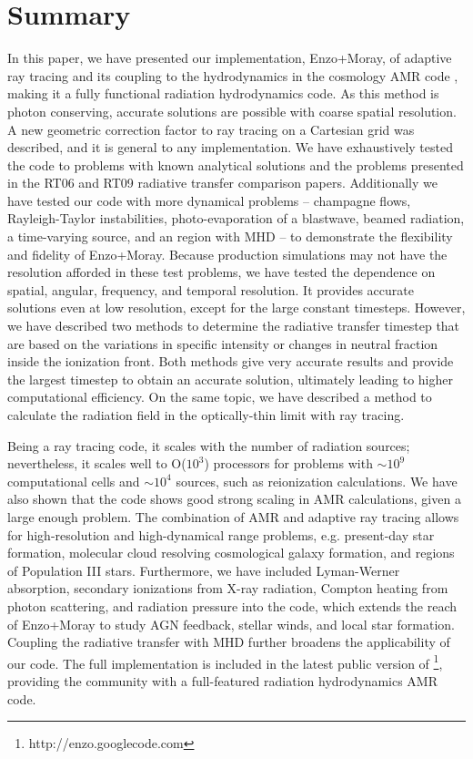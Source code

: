 \documentclass[useAMS,usenatbib,a4paper]{mn2e}
\begin{document}
\section{Summary}

In this paper, we have presented our implementation, Enzo+Moray, of
adaptive ray tracing \citep{Abel02_RT} and its coupling to the
hydrodynamics in the cosmology AMR code \enzo, making it a fully
functional radiation hydrodynamics code.  As this method is photon
conserving, accurate solutions are possible with coarse spatial
resolution.  A new geometric correction factor to ray tracing on a
Cartesian grid was described, and it is general to any implementation.
We have exhaustively tested the code to problems with known analytical
solutions and the problems presented in the RT06 and RT09 radiative
transfer comparison papers.  Additionally we have tested our code with
more dynamical problems -- champagne flows, Rayleigh-Taylor
instabilities, photo-evaporation of a blastwave, beamed radiation, a
time-varying source, and an \hii region with MHD -- to
demonstrate the flexibility and fidelity of Enzo+Moray.  Because
production simulations may not have the resolution afforded in these
test problems, we have tested the dependence on spatial, angular,
frequency, and temporal resolution.  It provides accurate solutions
even at low resolution, except for the large constant timesteps.
However, we have described two methods to determine the radiative
transfer timestep that are based on the variations in specific
intensity or changes in neutral fraction inside the ionization front.
Both methods give very accurate results and provide the largest
timestep to obtain an accurate solution, ultimately leading to higher
computational efficiency.  On the same topic, we have described a
method to calculate the radiation field in the optically-thin limit
with ray tracing.

Being a ray tracing code, it scales with the number of radiation
sources; nevertheless, it scales well to O($10^3$) processors for
problems with $\sim10^9$ computational cells and $\sim10^4$ sources,
such as reionization calculations.  We have also shown that the code
shows good strong scaling in AMR calculations, given a large enough
problem.  The combination of AMR and adaptive ray tracing allows for
high-resolution and high-dynamical range problems, e.g. present-day
star formation, molecular cloud resolving cosmological galaxy
formation, and \hii regions of Population III stars.  Furthermore, we
have included Lyman-Werner absorption, secondary ionizations from
X-ray radiation, Compton heating from photon scattering, and radiation
pressure into the code, which extends the reach of Enzo+Moray to study
AGN feedback, stellar winds, and local star formation.  Coupling the
radiative transfer with MHD further broadens the applicability of our
code.  The full implementation is included in the latest public
version of \enzo\footnote{http://enzo.googlecode.com}, providing the
community with a full-featured radiation hydrodynamics AMR code.
\end{document}
